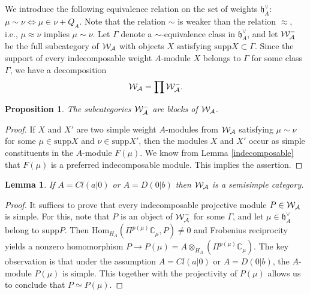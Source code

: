 \documentclass[12pt]{amsart}
\makeatletter
\def\mathcal{\cal}
\def\@putname#1#2#3#4{\def\@@ref{#3}\let\old@bf\bf
        \def\bf##1{\old@bf\if?\noexpand##1?{#4}\else##1\fi}%
	#1{#2}%
        \let\bf\old@bf}
\def\@putname#1#2#3#4{\def\@@ref{#3}\let\old@bf\bf	%
	\let\old@reset@font\reset@font			%
        \def\bf##1{\old@bf\if?\noexpand##1?{#4}\else##1\fi}%
	\def\reset@font##1##2{\old@reset@font##1\if?\noexpand##2?{#4}\else##2\fi}#1{#2}%
        \let\bf\old@bf\let\reset@font\old@reset@font}
\let\my@ref=\ref
\def\ref#1{\@putname\my@ref{#1}{#1}{\tiny\rm\@@ref}}
\theoremstyle{plain} %
\numberwithin{equation}{section}
\theoremstyle{definition}
\theoremstyle{remark}
\theoremstyle{plain} %
\newtheorem{lemma}[definition]{Lemma}
\newtheorem{proposition}[definition]{Proposition}
\newcommand{\cW}{\mathcal{W}}
\newcommand{\Hom}{\mathrm{Hom}}
\newcommand{\supp}{\mathrm{supp}}
\newcommand{\C}{\mathbb{C}}
\newcommand{\gh}{\mathfrak{h}}
\def\gh{\mathfrak{h}}
\makeatother
\begin{document}
      We introduce the following equivalence relation on the set of weights $\gh^{\vee}_A$:
 $\mu\sim\nu \Longleftrightarrow \mu\in\nu+Q_A$. Note that  the relation $\sim$ is weaker than the relation $\approx$, i.e.,   $\mu \approx\nu$ implies $\mu\sim\nu$.  Let $\Gamma$ denote a $\sim$-equivalence class in $\gh^{\vee}_A$, and let $\cW_A^\Gamma$ be the full subcategory of $\cW_A$ with objects $X$ satisfying $\supp X\subset\Gamma$.
 Since the support of every indecomposable weight $A$-module $X$ belongs to $\Gamma$ for some class $\Gamma$, we have a decomposition
 $$\cW_A=\prod \cW_A^\Gamma.$$

        \begin{proposition}\label{blocks} The subcategories $\cW_A^\Gamma$ are blocks of $\cW_A$. 
 \end{proposition}
 \begin{proof} If $X$ and $X'$ are two simple weight $A$-modules from $\cW_A$ satisfying  $\mu\sim\nu$ for some 
  $\mu\in \supp X$ and
   $\nu\in\supp X'$, then the modules $X$ and $X'$  occur as simple constituents in the $A$-module $F(\mu)$.  We know from Lemma \ref{indecomposable} that  $F(\mu)$ is a preferred indecomposable module. This implies the assertion.
   \end{proof}
   

        
    
   \begin{lemma}\label{semisimplicity} If $A=Cl(a|0)$ or $A=D(0|b)$ then $\cW_A$ is a semisimple category.
   \end{lemma}
   \begin{proof} It suffices to prove that every indecomposable projective module $P \in \cW_A$ is simple. For this, note that $P$ is an object of $\cW_A^\Gamma$ for some $\Gamma$, and let $\mu  \in \gh_A^{\vee}$ belong to $\supp P$. Then $\Hom_{H_A} (\Pi^{p(\mu)}\C_{\mu}, P) \neq 0$ and Frobenius reciprocity yields a nonzero homomorphism $P \to P(\mu) = A\otimes_{H_A} (\Pi^{p(\mu)} \mathbb C_\mu)$.  The key observation is that under the assumption  $A=Cl(a|0)$ or $A=D(0|b)$,  the $A$-module $P(\mu)$ is simple. This together with the projectivity of  $P(\mu)$  allows us to conclude that $P \simeq P(\mu)$.
     \end{proof}
    
\end{document}
